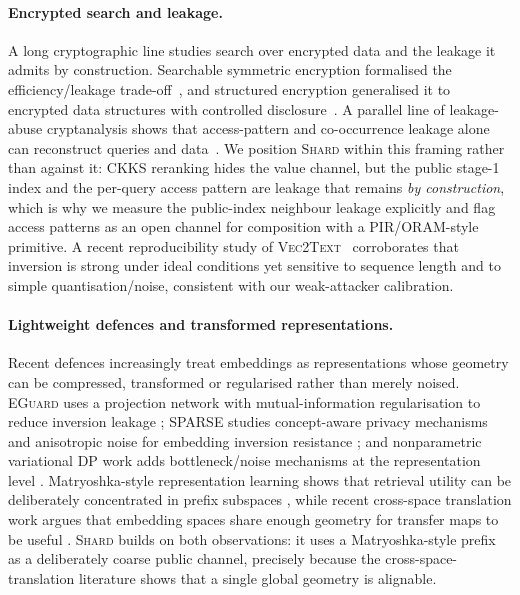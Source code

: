 \documentclass[11pt,a4paper]{article}
\begin{document}
\paragraph{Encrypted search and leakage.} A long cryptographic line studies
search over encrypted data and the leakage it admits by construction.
Searchable symmetric encryption formalised the efficiency/leakage
trade-off~\cite{ref_sse}, and structured encryption generalised it to
encrypted data structures with controlled disclosure~\cite{ref_structenc}.
A parallel line of leakage-abuse cryptanalysis shows that access-pattern and
co-occurrence leakage alone can reconstruct queries and
data~\cite{ref_leakageabuse,ref_accesspattern}. We position \textsc{Shard}
within this framing rather than against it: CKKS reranking hides the value
channel, but the public stage-1 index and the per-query access pattern are
leakage that remains \emph{by construction}, which is why we measure the
public-index neighbour leakage explicitly and flag access patterns as an
open channel for composition with a PIR/ORAM-style primitive. A recent
reproducibility study of \textsc{Vec2Text}~\cite{ref_v2t_repro} corroborates
that inversion is strong under ideal conditions yet sensitive to sequence
length and to simple quantisation/noise, consistent with our weak-attacker
calibration.

\paragraph{Lightweight defences and transformed representations.}
Recent defences increasingly treat embeddings as representations whose
geometry can be compressed, transformed or regularised rather than merely
noised. \textsc{EGuard} uses a projection network with mutual-information
regularisation to reduce inversion leakage \cite{ref_eguard};
\textsc{SPARSE} studies concept-aware privacy mechanisms and anisotropic
noise for embedding inversion resistance \cite{ref_sparse}; and
nonparametric variational DP work adds bottleneck/noise mechanisms at
the representation level \cite{ref_nvdp}. Matryoshka-style representation
learning shows that retrieval utility can be deliberately concentrated in
prefix subspaces \cite{ref_mrl}, while recent cross-space translation
work argues that embedding spaces share enough geometry for transfer
maps to be useful \cite{ref_vec2vec}. \textsc{Shard} builds on both
observations: it uses a Matryoshka-style prefix as a deliberately coarse
public channel, precisely because the cross-space-translation literature
shows that a single global geometry is alignable.
\end{document}
